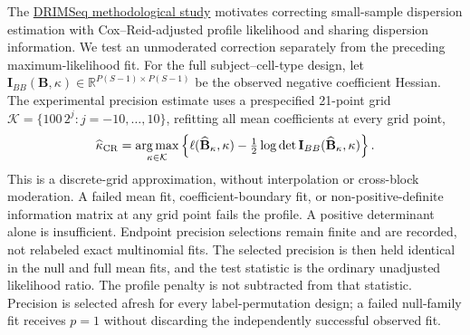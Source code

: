 \documentclass[11pt]{article}
\begin{document}
The \href{https://pmc.ncbi.nlm.nih.gov/articles/PMC5200948/}{DRIMSeq methodological study} motivates correcting small-sample dispersion estimation with Cox--Reid-adjusted profile likelihood and sharing dispersion information. We test an unmoderated correction separately from the preceding maximum-likelihood fit. For the full subject--cell-type design, let \(\mathbf I_{BB}(\mathbf B,\kappa)\in\mathbb R^{P(S-1)\times P(S-1)}\) be the observed negative coefficient Hessian. The experimental precision estimate uses a prespecified 21-point grid \(\mathcal K=\{100\,2^j:j=-10,\ldots,10\}\), refitting all mean coefficients at every grid point, \begin{equation}\widehat\kappa_{\rm CR}=\underset{\kappa\in\mathcal K}{\arg\max}\left\{\ell(\widehat{\mathbf B}_\kappa,\kappa)-\tfrac12\log\det\mathbf I_{BB}(\widehat{\mathbf B}_\kappa,\kappa)\right\}.\end{equation} This is a discrete-grid approximation, without interpolation or cross-block moderation. A failed mean fit, coefficient-boundary fit, or non-positive-definite information matrix at any grid point fails the profile. A positive determinant alone is insufficient. Endpoint precision selections remain finite and are recorded, not relabeled exact multinomial fits. The selected precision is then held identical in the null and full mean fits, and the test statistic is the ordinary unadjusted likelihood ratio. The profile penalty is not subtracted from that statistic. Precision is selected afresh for every label-permutation design; a failed null-family fit receives \(p=1\) without discarding the independently successful observed fit.
\end{document}
